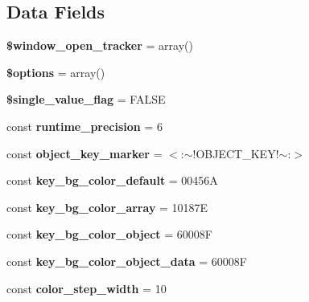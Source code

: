 \subsection*{Data Fields}
\begin{DoxyCompactItemize}
\item 
\mbox{\label{class_dbug_l_ac97e4fac24ade158e91acf313dd8a155}} 
{\bfseries \$window\+\_\+open\+\_\+tracker} = array()
\item 
\mbox{\label{class_dbug_l_a011800c63ece4cbbfa77136a20607023}} 
{\bfseries \$options} = array()
\item 
\mbox{\label{class_dbug_l_ad3fb20899a2279c7de28dc2ee908f7db}} 
{\bfseries \$single\+\_\+value\+\_\+flag} = F\+A\+L\+SE
\item 
\mbox{\label{class_dbug_l_aecb99deaead9e8ade9b0ec994992cfe4}} 
const {\bfseries runtime\+\_\+precision} = 6
\item 
\mbox{\label{class_dbug_l_a1119f5dcc6e5189e0411d9e4b7f80dd0}} 
const {\bfseries object\+\_\+key\+\_\+marker} = \textquotesingle{}$<$\+:$\sim$!O\+B\+J\+E\+C\+T\+\_\+\+K\+E\+Y!$\sim$\+:$>$\textquotesingle{}
\item 
\mbox{\label{class_dbug_l_aa97b017d454064a95dd08fbec7bf5f6f}} 
const {\bfseries key\+\_\+bg\+\_\+color\+\_\+default} = \textquotesingle{}00456\+A\textquotesingle{}
\item 
\mbox{\label{class_dbug_l_a0c40e80b5a47f7358c7bf9a2459ce5e2}} 
const {\bfseries key\+\_\+bg\+\_\+color\+\_\+array} = \textquotesingle{}10187\+E\textquotesingle{}
\item 
\mbox{\label{class_dbug_l_a82f9deea9c5b770dfd19211792cec4b2}} 
const {\bfseries key\+\_\+bg\+\_\+color\+\_\+object} = \textquotesingle{}60008\+F\textquotesingle{}
\item 
\mbox{\label{class_dbug_l_ab41675023cb1eee3a91b276a8ae294d5}} 
const {\bfseries key\+\_\+bg\+\_\+color\+\_\+object\+\_\+data} = \textquotesingle{}60008\+F\textquotesingle{}
\item 
\mbox{\label{class_dbug_l_a22ff5a7c0075ac8e3daf381a966a8314}} 
const {\bfseries color\+\_\+step\+\_\+width} = 10
\end{DoxyCompactItemize}
